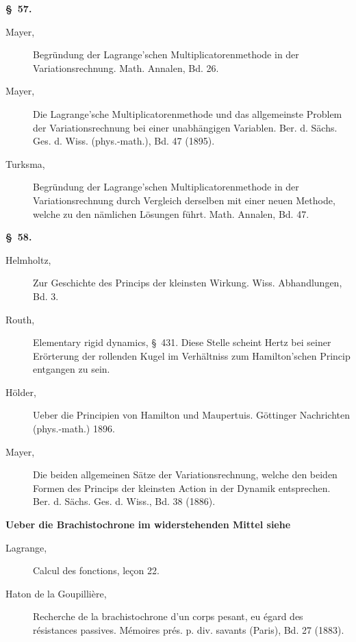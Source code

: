 \documentclass[11pt,a4paper,leqno]{article}
\begin{document}
\begin{center}{\bfseries \S~57.}\end{center}

\begin{description}
\item[Mayer,] Begründung der Lagrange'schen Multiplicatorenmethode in der
Variationsrechnung. Math. Annalen, Bd. 26.

\item[Mayer,] Die Lagrange'sche Multiplicatorenmethode und das allgemeinste
Problem der Variationsrechnung bei einer unabhängigen Variablen. Ber. d.
Sächs. Ges. d. Wiss. (phys.-math.), Bd. 47 (1895).

\item[Turksma,] Begründung der Lagrange'schen Multiplicatorenmethode in der
Variationsrechnung durch Vergleich derselben mit einer neuen Methode, welche
zu den nämlichen Lösungen führt. Math. Annalen, Bd. 47.
\end{description}

\begin{center}{\bfseries \S~58.}\end{center}

\begin{description}
\item[Helmholtz,] Zur Geschichte des Princips der kleinsten Wirkung. Wiss.
Abhandlungen, Bd. 3.

\item[Routh,] Elementary rigid dynamics, \S~431. Diese Stelle scheint Hertz bei
seiner Erörterung der rollenden Kugel im Verhältniss zum Hamilton'schen
Princip entgangen zu sein.

\item[Hölder,] Ueber die Principien von Hamilton und Maupertuis. Göttinger
Nachrichten (phys.-math.) 1896.

\item[Mayer,] Die beiden allgemeinen Sätze der Variationsrechnung, welche den
beiden Formen des Princips der kleinsten Action in der Dynamik entsprechen.
Ber. d. Sächs. Ges. d. Wiss., Bd. 38 (1886).
\end{description}

\begin{center}{\bfseries Ueber die Brachistochrone im widerstehenden Mittel siehe}\end{center}

\begin{description}
\item[Lagrange,] Calcul des fonctions, leçon 22.

\item[Haton de la Goupillière,] Recherche de la brachistochrone d'un corps
pesant, eu égard des résistances passives. Mémoires prés. p. div. savants
(Paris), Bd. 27 (1883).
\end{description}
\end{document}
